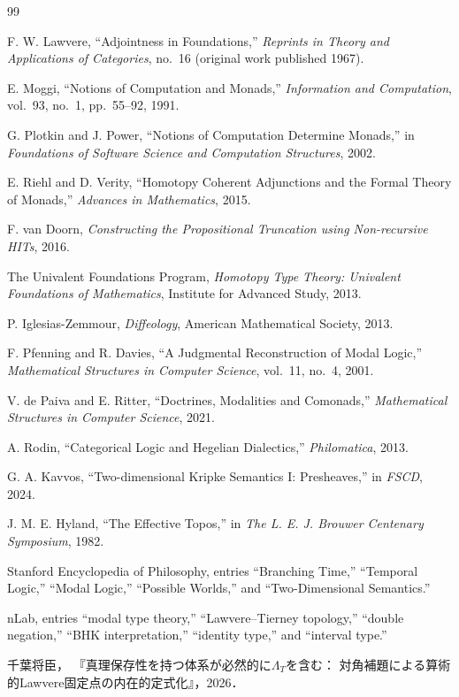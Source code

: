 \documentclass[11pt,a4paper]{ltjsarticle}
\theoremstyle{remark}
\newcommand{\ArithmeticFixedPoint}{\Lambda_T}
\begin{document}
\begin{thebibliography}{99}

F. W. Lawvere,
``Adjointness in Foundations,''
\textit{Reprints in Theory and Applications of Categories}, no.~16
(original work published 1967).

E. Moggi,
``Notions of Computation and Monads,''
\textit{Information and Computation}, vol.~93, no.~1, pp.~55--92, 1991.

G. Plotkin and J. Power,
``Notions of Computation Determine Monads,''
in \textit{Foundations of Software Science and Computation Structures}, 2002.

E. Riehl and D. Verity,
``Homotopy Coherent Adjunctions and the Formal Theory of Monads,''
\textit{Advances in Mathematics}, 2015.

F. van Doorn,
\textit{Constructing the Propositional Truncation using Non-recursive HITs},
2016.

The Univalent Foundations Program,
\textit{Homotopy Type Theory: Univalent Foundations of Mathematics},
Institute for Advanced Study, 2013.

P. Iglesias-Zemmour,
\textit{Diffeology},
American Mathematical Society, 2013.

F. Pfenning and R. Davies,
``A Judgmental Reconstruction of Modal Logic,''
\textit{Mathematical Structures in Computer Science}, vol.~11, no.~4, 2001.

V. de Paiva and E. Ritter,
``Doctrines, Modalities and Comonads,''
\textit{Mathematical Structures in Computer Science}, 2021.

A. Rodin,
``Categorical Logic and Hegelian Dialectics,''
\textit{Philomatica}, 2013.

G. A. Kavvos,
``Two-dimensional Kripke Semantics I: Presheaves,''
in \textit{FSCD}, 2024.

J. M. E. Hyland,
``The Effective Topos,''
in \textit{The L. E. J. Brouwer Centenary Symposium}, 1982.

Stanford Encyclopedia of Philosophy,
entries ``Branching Time,'' ``Temporal Logic,'' ``Modal Logic,''
``Possible Worlds,'' and ``Two-Dimensional Semantics.''

nLab,
entries ``modal type theory,'' ``Lawvere--Tierney topology,''
``double negation,'' ``BHK interpretation,'' ``identity type,'' and ``interval type.''

千葉将臣，
『真理保存性を持つ体系が必然的に$\ArithmeticFixedPoint$を含む：
対角補題による算術的Lawvere固定点の内在的定式化』，2026．

\end{thebibliography}
\end{document}

